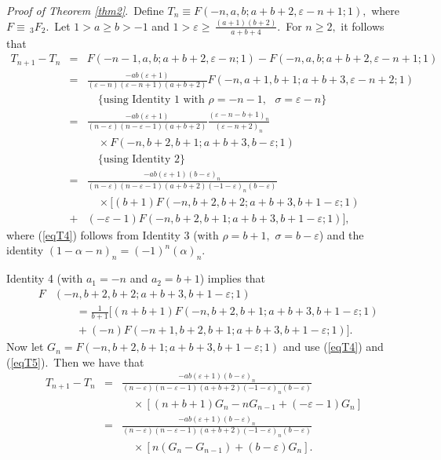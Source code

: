 \documentclass[final,oneeqnum]{siamltex}
\begin{document}
{\it Proof of Theorem {\rm\ref{thm2}}}.\ Define
$T_{n}\equiv  F\left(-n,a,b;a+b+2,\varepsilon -n +1;1\right),$ where $F\equiv
\,_{3}F_{2}$.\ Let  $1>a\geq b>-1$ and
$1>\varepsilon\geq\,\frac{(a+1)(b+2)}{a+b+4}$.\ For $n\geq2,$
 it follows that
\begin{eqnarray}  
T_{n+1} - T_{n} &=&
 F\left(-n-1,a,b;a+b+2,\varepsilon
-n;1\right)-F\left(-n,a,b;a+b+2,\varepsilon -n +1;1\right)   \nonumber\\
\ &=& \frac{-a b(\varepsilon+1)}{(\varepsilon-n)
(\varepsilon-n+1)(a+b+2)}F\left(-n,a+1,b+1;a+b+3,\varepsilon -n+2;1\right) \nonumber \\ 
&\ & \quad \{ \mbox{using Identity 1
with $\rho = -n-1,$ $\sigma=\varepsilon -n$}\} \nonumber\\
\ &=& \frac{-a b
(\varepsilon+1)}{(n-\varepsilon)(n-\varepsilon-1)(a+b+2)}
\frac{(\varepsilon-n-b+1)_{n}}{(\varepsilon-n+2)_{n}} \nonumber \\ 
&\ & \quad \times F\left(-n,b+2,b+1;a+b+3,b-\varepsilon ;1\right) \nonumber \\ 
&\ & \quad \{ \mbox{using Identity 2}\}\nonumber\\
\ &=& \frac{-a b
(\varepsilon+1)(b-\varepsilon)_{n}}{(n-\varepsilon)
(n-\varepsilon-1)(a+b+2)(-1-\varepsilon)_{n}(b-\varepsilon)} \nonumber \\ 
&\ & \quad \times [(b+1)F\left(-n,b+2,b+2;a+b+3,b+1-\varepsilon;1\right)\nonumber \\
\  &+&(-\varepsilon
-1)F\left(-n,b+2,b+1;a+b+3,b+1-\varepsilon;1\right)],  \label{eqT4} 
\end{eqnarray} 
where (\ref{eqT4}) follows from Identity 3
 (with $\rho = b+1,$ $\sigma=b-\varepsilon$) and the identity
$(1-\alpha-n)_{n} = (-1)^n(\alpha)_{n}$.

\noindent Identity 4 (with $a_{1} = -n$ and $a_{2} = b+1$)
implies that
\begin{eqnarray}
&F&\left(-n,b+2,b+2;a+b+3,b+1-\varepsilon;1\right) \nonumber \\
&\ & \quad \quad =\frac{1}{b+1}[(n+b+1)F\left(-n,b+2,b+1;a+b+3,b+1-\varepsilon;1 \right) \nonumber \\ 
&\ & \quad \quad + (-n)F\left(-n+1,b+2,b+1;a+b+3,b+1-\varepsilon;1\right)].\  \label{eqT5}
\end{eqnarray} 
Now let $G_{n} = F\left(-n,b+2,b+1;a+b+3,b+1-\varepsilon;1\right)$
 and use (\ref{eqT4}) and (\ref{eqT5}).\ Then we
have that
\begin{eqnarray} 
T_{n+1} - T_{n} &=& \frac{-a b
(\varepsilon+1)(b-\varepsilon)_{n}}{(n-\varepsilon)(n-\varepsilon-
1)(a+b+2)(-1-\varepsilon)_{n}(b-\varepsilon)}\nonumber \\
&\ & \quad \times [(n+b+1)G_{n}
- nG_{n-1} +(-\varepsilon-1)G_{n}]\nonumber \\
\ &=&  \frac{-a b
(\varepsilon+1)(b-\varepsilon)_{n}}{(n-\varepsilon)(n-\varepsilon-1)(a+b+2)(-1
-\varepsilon)_{n}(b-\varepsilon)}\nonumber \\
&\ & \quad \times [n(G_{n}
- G_{n-1})   +(b-\varepsilon)G_{n}].\label{eqT6}
\end{eqnarray}
\end{document}
